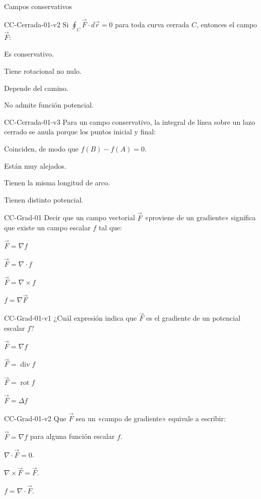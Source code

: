 \documentclass[a4,11pt]{aleph-notas}
\begin{document}
\begin{quiz}{Campos conservativos}
\begin{multi}[]%
    {CC-Cerrada-01-v2}
    Si $\displaystyle\oint_C \vec{F}\cdot d\vec{r}=0$ para toda curva cerrada $C$, entonces el campo $\vec{F}$:
    \item* Es conservativo.
    \item Tiene rotacional no nulo.
    \item Depende del camino.
    \item No admite función potencial.
\end{multi}

\begin{multi}[]%
    {CC-Cerrada-01-v3}
    Para un campo conservativo, la integral de línea sobre un lazo cerrado se anula porque los puntos inicial y final:
    \item* Coinciden, de modo que $f(B)-f(A)=0$.
    \item Están muy alejados.
    \item Tienen la misma longitud de arco.
    \item Tienen distinto potencial.
\end{multi}

\begin{multi}[]%
    {CC-Grad-01}
    Decir que un campo vectorial $\vec{F}$ «proviene de un gradiente» significa que existe un campo escalar $f$ tal que:
    \item* $\vec{F} = \nabla f$
    \item $\vec{F} = \nabla \cdot f$
    \item $\vec{F} = \nabla \times f$
    \item $f = \nabla \vec{F}$
\end{multi}

\begin{multi}[]%
    {CC-Grad-01-v1}
    ¿Cuál expresión indica que $\vec{F}$ es el gradiente de un potencial escalar $f$?
    \item* $\vec{F} = \nabla f$
    \item $\vec{F} = \operatorname{div} f$
    \item $\vec{F} = \operatorname{rot} f$
    \item $\vec{F} = \Delta f$
\end{multi}

\begin{multi}[]%
    {CC-Grad-01-v2}
    Que $\vec{F}$ sea un «campo de gradiente» equivale a escribir:
    \item* $\vec{F} = \nabla f$ para alguna función escalar $f$.
    \item $\nabla\cdot\vec{F} = 0$.
    \item $\nabla\times\vec{F} = \vec{F}$.
    \item $f = \nabla\cdot\vec{F}$.
\end{multi}


\end{quiz}
\end{document}
